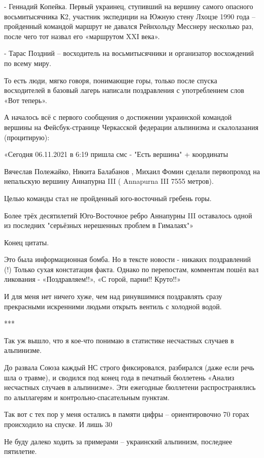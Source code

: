 - Геннадий Копейка. Первый украинец, ступивший на вершину самого опасного
восьмитысячника К2, участник экспедиции на Южную стену Лхоцзе 1990 года –
пройденный командой маршрут не давался Рейнхольду Месснеру несколько раз, после
чего тот назвал его «маршрутом XXІ века».

- Тарас Поздний – восходитель на восьмитысячники и организатор восхождений по
всему миру.

То есть люди, мягко говоря, понимающие горы, только после спуска восходителей в
базовый лагерь написали поздравления с употреблением слов «Вот теперь».

А началось всё с первого сообщения о достижении украинской командой вершины на
Фейсбук-странице Черкасской федерации альпинизма и скалолазания (процитирую):

«Сегодня 06.11.2021 в 6:19 пришла смс - "Есть вершина" + координаты 

Вячеслав Полежайко, Никита Балабанов , Михаил Фомин сделали первопроход на
непальскую вершину Аннапурна III ( Annapurna III 7555 метров).

Целью команды стал не пройденный юго-восточный гребень горы.

Более трёх десятилетий Юго-Восточное ребро Аннапурны III оставалось одной из
последних "серьёзных нерешенных проблем в Гималаях"»

Конец цитаты.

Это была информационная бомба. Но в тексте новости - никаких поздравлений (!)
Только сухая констатация факта. Однако по перепостам, комментам пошёл вал
ликования - «Поздравляем!!», «С горой, парни!! Круто!!»

И для меня нет ничего хуже, чем над ринувшимися поздравлять сразу прекрасными
искренними людьми открыть вентиль с холодной водой.

***

Так уж вышло, что я кое-что понимаю в статистике несчастных случаев в
альпинизме.

До развала Союза каждый НС строго фиксировался, разбирался (даже если речь шла
о травме), и сводился под конец года в печатный бюллетень «Анализ несчастных
случаев в альпинизме». Эти ежегодные бюллетени распространялись по альплагерям
и контрольно-спасательным пунктам.

Так вот с тех пор у меня остались в памяти цифры – ориентировочно 70%
горах происходило на спуске. И лишь 30%

Не буду далеко ходить за примерами – украинский альпинизм, последнее пятилетие.

